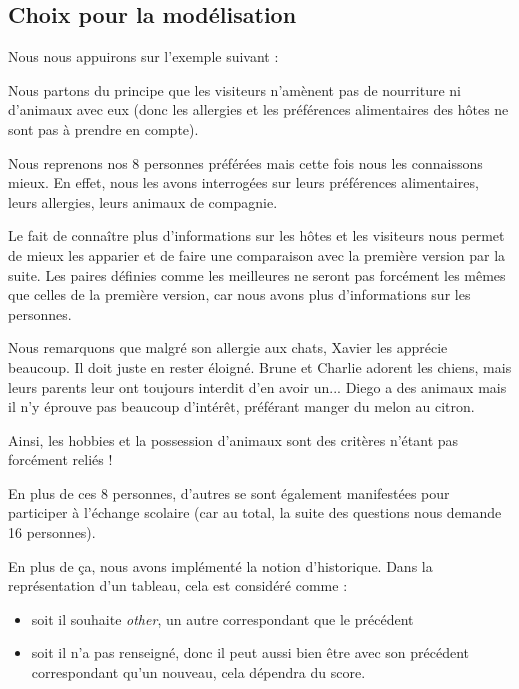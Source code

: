 \documentclass{mytex}
\begin{document}
\subsection{Choix pour la modélisation}

Nous nous appuirons sur l'exemple suivant :


Nous partons du principe que les visiteurs n'amènent pas de nourriture ni d'animaux avec eux (donc les allergies et les préférences alimentaires des hôtes ne sont pas à prendre en compte).


Nous reprenons nos 8 personnes préférées mais cette fois nous les connaissons mieux. 
En effet, nous les avons interrogées sur leurs préférences alimentaires, leurs allergies, leurs animaux de compagnie.

Le fait de connaître plus d'informations sur les hôtes et les visiteurs nous permet de mieux les apparier et de faire une comparaison avec la première version par la suite.
Les paires définies comme les meilleures ne seront pas forcément les mêmes que celles de la première version, car nous avons plus d'informations sur les personnes.

Nous remarquons que malgré son allergie aux chats, Xavier les apprécie beaucoup. Il doit juste en rester éloigné.	
Brune et Charlie adorent les chiens, mais leurs parents leur ont toujours interdit d'en avoir un...
Diego a des animaux mais il n'y éprouve pas beaucoup d'intérêt, préférant manger du melon au citron.

Ainsi, les hobbies et la possession d'animaux sont des critères n'étant pas forcément reliés !

En plus de ces 8 personnes, d'autres se sont également manifestées pour participer à l'échange scolaire (car au total, la suite des questions nous demande 16 personnes).


En plus de ça, nous avons implémenté la notion d'historique. Dans la représentation d'un tableau, cela est considéré comme :

\begin{itemize}
    \item soit il souhaite \textit{other}, un autre correspondant que le précédent
    \item soit il n'a pas renseigné, donc il peut aussi bien être avec son précédent correspondant qu'un nouveau, cela dépendra du score.
\end{itemize}
\end{document}
